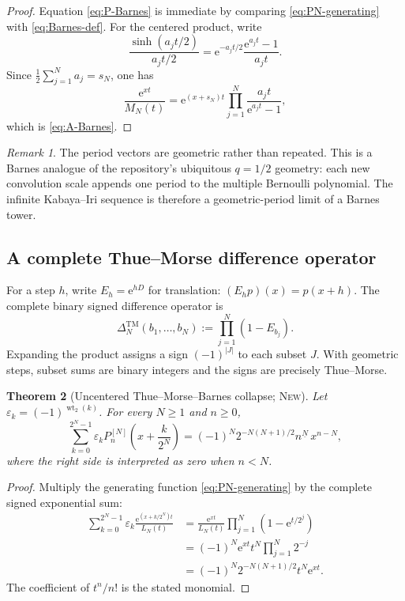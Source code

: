\documentclass[11pt,oneside]{article}
\theoremstyle{frontier}
\newtheorem{theorem}{Theorem}[section]
\theoremstyle{definition}
\theoremstyle{remark}
\newtheorem{remark}[theorem]{Remark}
\newcommand{\e}{\mathrm e}
\newcommand{\wt}{\operatorname{wt}_2}
\newcommand{\eps}{\varepsilon}
\newcommand{\fall}[2]{#1^{\underline{#2}}}
\newcommand{\statusnew}{\textsc{New}}
\begin{document}
\begin{proof}
Equation \eqref{eq:P-Barnes} is immediate by comparing
\eqref{eq:PN-generating} with \eqref{eq:Barnes-def}.  For the centered product, write
\[
 \frac{\sinh(a_jt/2)}{a_jt/2}
 =\e^{-a_jt/2}\frac{\e^{a_jt}-1}{a_jt}.
\]
Since $\frac12\sum_{j=1}^{N}a_j=s_N$, one has
\[
 \frac{\e^{xt}}{M_N(t)}
 =\e^{(x+s_N)t}\prod_{j=1}^{N}\frac{a_jt}{\e^{a_jt}-1},
\]
which is \eqref{eq:A-Barnes}.
\end{proof}

\begin{remark}
The period vectors are geometric rather than repeated.  This is a Barnes analogue of the
repository's ubiquitous $q=1/2$ geometry: each new convolution scale appends one period to the
multiple Bernoulli polynomial.  The infinite Kabaya--Iri sequence is therefore a geometric-period
limit of a Barnes tower.
\end{remark}

\subsection{A complete Thue--Morse difference operator}

For a step $h$, write $E_h=\e^{hD}$ for translation: $(E_hp)(x)=p(x+h)$.  The complete binary
signed difference operator is
\begin{equation}
 \Delta_N^{\mathrm{TM}}(b_1,\ldots,b_N)
 :=\prod_{j=1}^{N}(1-E_{b_j}).
 \label{eq:TM-operator}
\end{equation}
Expanding the product assigns a sign $(-1)^{|J|}$ to each subset $J$.  With geometric steps, subset
sums are binary integers and the signs are precisely Thue--Morse.

\begin{theorem}[Uncentered Thue--Morse--Barnes collapse; \statusnew]
\label{thm:TM-uncentered}
Let $\eps_k=(-1)^{\wt(k)}$.  For every $N\ge1$ and $n\ge0$,
\begin{equation}
 \boxed{
 \sum_{k=0}^{2^N-1}\eps_k
 P_n^{[N]}\!\left(x+\frac{k}{2^N}\right)
 =(-1)^N2^{-N(N+1)/2}\fall nN\,x^{n-N},
 }
 \label{eq:TM-P-collapse}
\end{equation}
where the right side is interpreted as zero when $n<N$.
\end{theorem}

\begin{proof}
Multiply the generating function \eqref{eq:PN-generating} by the complete signed exponential sum:
\begin{align*}
 \sum_{k=0}^{2^N-1}\eps_k
 \frac{\e^{(x+k/2^N)t}}{L_N(t)}
 &=\frac{\e^{xt}}{L_N(t)}
   \prod_{j=1}^{N}(1-\e^{t/2^j})\\
 &=(-1)^N\e^{xt}t^N\prod_{j=1}^{N}2^{-j}\\
 &=(-1)^N2^{-N(N+1)/2}t^N\e^{xt}.
\end{align*}
The coefficient of $t^n/n!$ is the stated monomial.
\end{proof}
\end{document}
